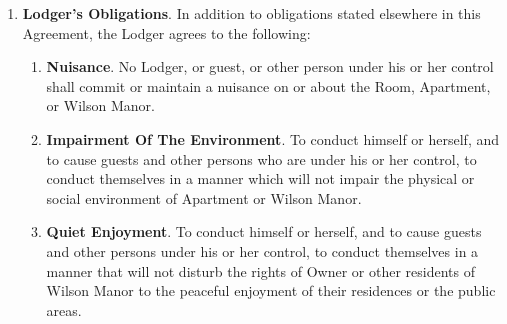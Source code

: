\documentclass[12pt,letterpaper]{article}
\newcommand{\lodger}{Lodger}
\newcommand{\management}{Management}
\newcommand{\condo}{Wilson Manor}
\newcommand{\apt}{Apartment}
\newcommand{\room}{Room}
\begin{document}
\begin{enumerate}
\begin{enumerate}
\begin{enumerate}
							As used throughout this Agreement, ``other person under his or her control' shall mean any person other than the \lodger{}, or guest, who enters \condo{} property at the express or implied invitation of the \lodger{}, or his or her guest. 
					\end{enumerate}
				\item \textbf{Criminal Drug Related Activity}. \label{drug}
					No \lodger{}, guest, or other person under his or her control shall engage in any Drug-Related Criminal Activity on or off the property of \condo{}. As used in this Agreement, ``Drug-Related Criminal Activity' shall mean the illegal manufacture, sale, distribution, use or possession with the intent to manufacture, sell, distribute or use a controlled substance as defined in section 102 of the Controlled Substances Act (21 U.S.C. 802). The \lodger{} specifically understands and acknowledges that: 
					\begin{enumerate}
						\item The \lodger{} has an affirmative obligation to ensure that the \lodger{}, or guest, or other person under his or her control do not commit any Drug-Related Criminal Activity; 
						\item The \lodger{} shall be held strictly and vicariously liable for any such Drug-Related Criminal Activity which is committed by a guest, or other person under his or her control; and 
						\item \management{} will terminate this Agreement for any such criminal or illegal act, regardless of whether there is an arrest or a conviction.
					\end{enumerate}
			\end{enumerate}
		\item \textbf{\lodger{}'s Obligations}.
			In addition to obligations stated elsewhere in this Agreement, the \lodger{} agrees to the following: 
			\begin{enumerate}
				\item \textbf{Nuisance}. No \lodger{}, or guest, or other person under his or her control shall commit or maintain a nuisance on or about the \room{}, \apt{}, or \condo{}. 
				\item \textbf{Impairment Of The Environment}. To conduct himself or herself, and to cause guests and other persons who are under his or her control, to conduct themselves in a manner which will not impair the physical or social environment of \apt{} or \condo{}. 
				\item \textbf{Quiet Enjoyment}. To conduct himself or herself, and to cause guests and other persons under his or her control, to conduct themselves in a manner that will not disturb the rights of Owner or other residents of \condo{} to the peaceful enjoyment of their residences or the public areas. 

\end{enumerate}
\end{enumerate}
\end{document}
